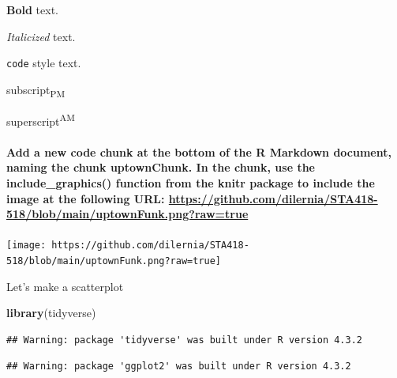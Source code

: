 \documentclass[
]{article}
\newenvironment{Shaded}{\begin{snugshade}}{\end{snugshade}}
\newcommand{\FunctionTok}[1]{\textcolor[rgb]{0.13,0.29,0.53}{\textbf{#1}}}
\newcommand{\NormalTok}[1]{#1}
\begin{document}
\textbf{Bold} text.

\emph{Italicized} text.

\texttt{code} style text.

subscript\textsubscript{PM}

superscript\textsuperscript{AM}

\hypertarget{add-a-new-code-chunk-at-the-bottom-of-the-r-markdown-document-naming-the-chunk-uptownchunk.-in-the-chunk-use-the-include_graphics-function-from-the-knitr-package-to-include-the-image-at-the-following-url-httpsgithub.comdilerniasta418-518blobmainuptownfunk.pngrawtrue}{%
\paragraph{\texorpdfstring{Add a new code chunk at the bottom of the R
Markdown document, naming the chunk uptownChunk. In the chunk, use the
include\_graphics() function from the knitr package to include the image
at the following URL:
\url{https://github.com/dilernia/STA418-518/blob/main/uptownFunk.png?raw=true}}{Add a new code chunk at the bottom of the R Markdown document, naming the chunk uptownChunk. In the chunk, use the include\_graphics() function from the knitr package to include the image at the following URL: https://github.com/dilernia/STA418-518/blob/main/uptownFunk.png?raw=true}}\label{add-a-new-code-chunk-at-the-bottom-of-the-r-markdown-document-naming-the-chunk-uptownchunk.-in-the-chunk-use-the-include_graphics-function-from-the-knitr-package-to-include-the-image-at-the-following-url-httpsgithub.comdilerniasta418-518blobmainuptownfunk.pngrawtrue}}

\texttt{[image: https://github.com/dilernia/STA418-518/blob/main/uptownFunk.png?raw=true]}

Let's make a scatterplot

\begin{Shaded}
\begin{Highlighting}[]
\FunctionTok{library}\NormalTok{(tidyverse)}
\end{Highlighting}
\end{Shaded}

\begin{verbatim}
## Warning: package 'tidyverse' was built under R version 4.3.2
\end{verbatim}

\begin{verbatim}
## Warning: package 'ggplot2' was built under R version 4.3.2
\end{verbatim}
\end{document}

